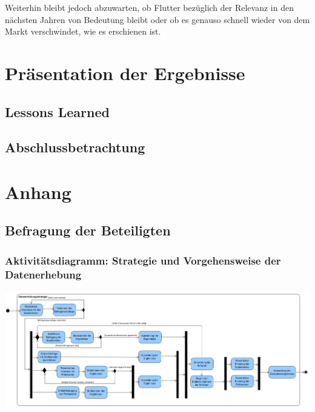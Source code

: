 \documentclass[bibliography=totoc,listof=totoc,BCOR=5mm,DIV=12,oneside]{scrbook}
\begin{document}
\par \bigskip Weiterhin bleibt jedoch abzuwarten, ob Flutter bezüglich der Relevanz in den nächsten Jahren von Bedeutung bleibt oder ob es genauso schnell wieder von dem Markt verschwindet, wie es erschienen ist.


\chapter{Präsentation der Ergebnisse} \label{chap:ergebnisse}
\section{Lessons Learned}
\section{Abschlussbetrachtung}

\listoftables
\listoffigures
\lstlistoflistings
\nocite{*}
\printbibliography

\newpage
\appendix
\chapter{Anhang}

\newpage
\section{Befragung der Beteiligten}

\newpage
\subsection{Aktivitätsdiagramm: Strategie und Vorgehensweise der Datenerhebung}
\label{anhang:datenerhebungStrategieAktivitätsdiagramm}

\newpage
\pagestyle{empty}%
\begin{center}
\includegraphics[scale=0.6, angle=90]{Bilder/Diagramme/AnalysestrategieDetails.png}
\end{center}
\end{document}
